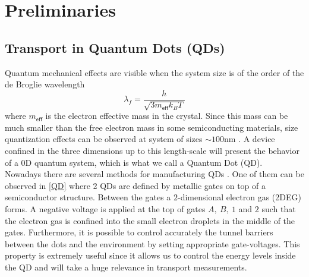 \chapter{Preliminaries}

\section{Transport in Quantum Dots (QDs)}
Quantum mechanical effects are visible when the system size is of
the order of the de Broglie wavelength \citep[(1.1)]{bimberg_quantum_1999}
\[
\lambda_{f}=\frac{h}{\sqrt{3m_{\mathsf{eff}}k_{B}T}}
\]
 where $m_{\mathsf{eff}}$ is the electron effective mass in the crystal.
Since this mass can be much smaller than the free electron mass in
some semiconducting materials, size quantization effects can be observed
at system of sizes $\sim100\mbox{nm}$ \citep[2.1]{sindel_numerical_2005}.
A device confined in the three dimensions up to this length-scale
will present the behavior of a $0$D quantum system, which is what
we call a Quantum Dot (QD).\\

Nowadays there are several methods for manufacturing QDs \citep{bimberg_quantum_1999}.
One of them can be observed in \ref{QD} where 2 QDs are defined by
metallic gates on top of a semiconductor structure. Between the gates
a $2$-dimensional electron gas (2DEG) forms. A negative voltage is
applied at the top of gates $A,\ B,\ 1$ and $2$ such that the electron
gas is confined into the small electron droplets in the middle of
the gates. Furthermore, it is possible to control accurately the tunnel
barriers between the dots and the environment by setting appropriate
gate-voltages. This property is extremely useful since it allows us
to control the energy levels inside the QD and will take a huge relevance
in transport measurements. \\

